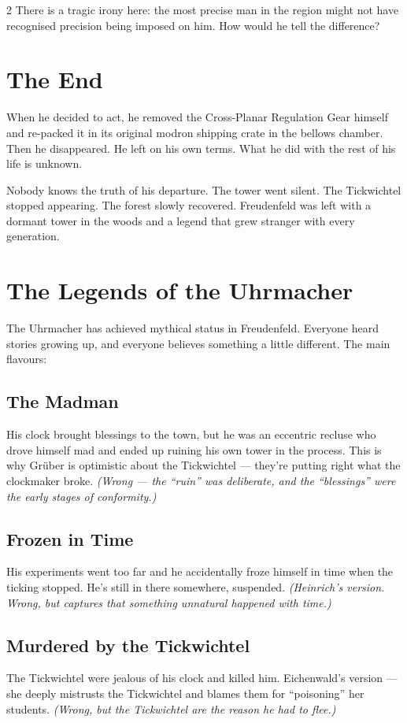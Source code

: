 \documentclass[10pt,letterpaper]{article}
\begin{document}
\begin{multicols}{2}
There is a tragic irony here: the most precise man in the region might not have recognised precision being imposed on him. How would he tell the difference?

\section*{The End}
When he decided to act, he removed the Cross-Planar Regulation Gear himself and re-packed it in its original modron shipping crate in the bellows chamber. Then he disappeared. He left on his own terms. What he did with the rest of his life is unknown.

Nobody knows the truth of his departure. The tower went silent. The Tickwichtel stopped appearing. The forest slowly recovered. Freudenfeld was left with a dormant tower in the woods and a legend that grew stranger with every generation.

\section*{The Legends of the Uhrmacher}
The Uhrmacher has achieved mythical status in Freudenfeld. Everyone heard stories growing up, and everyone believes something a little different. The main flavours:

\subsection*{The Madman}
His clock brought blessings to the town, but he was an eccentric recluse who drove himself mad and ended up ruining his own tower in the process. This is why Grüber is optimistic about the Tickwichtel --- they're putting right what the clockmaker broke. \textit{(Wrong --- the ``ruin'' was deliberate, and the ``blessings'' were the early stages of conformity.)}

\subsection*{Frozen in Time}
His experiments went too far and he accidentally froze himself in time when the ticking stopped. He's still in there somewhere, suspended. \textit{(Heinrich's version. Wrong, but captures that something unnatural happened with time.)}

\subsection*{Murdered by the Tickwichtel}
The Tickwichtel were jealous of his clock and killed him. Eichenwald's version --- she deeply mistrusts the Tickwichtel and blames them for ``poisoning'' her students. \textit{(Wrong, but the Tickwichtel are the reason he had to flee.)}


\end{multicols}
\end{document}
